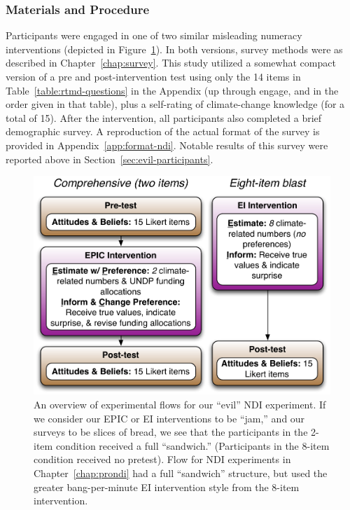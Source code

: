 \subsubsection{Materials and Procedure}

Participants were engaged in one of two similar misleading numeracy
interventions (depicted in Figure~\ref{fig:evil-flow}). In both versions, survey
methods were as described in Chapter~\ref{chap:survey}. This study utilized a
somewhat compact version of a pre and post-intervention test using only the 14
items in Table~\ref{table:rtmd-questions} in the Appendix (up through
\textsf{engage}, and in the order given in that table), plus a self-rating of
climate-change knowledge (for a total of 15).  After the intervention, all
participants also completed a brief demographic survey.  A reproduction of the
actual format of the survey is provided in Appendix~\ref{app:format-ndi}.
Notable results of this survey were reported above in
Section~\ref{sec:evil-participants}.

\begin{figure}[h]
    \includegraphics[width=6.5in]{evil-ndi-survey-flow.pdf}
    \caption{An overview of experimental flows for our “evil” NDI experiment. If
        we consider our EPIC or EI interventions to be “jam,” and our surveys to
        be slices of bread, we see that the participants in the 2-item condition
        received a full “sandwich.” (Participants in the 8-item condition
        received no pretest).  Flow for NDI experiments in
        Chapter~\ref{chap:prondi} had a full “sandwich” structure, but used the
        greater bang-per-minute EI intervention style from the 8-item
        intervention.}
    \label{fig:evil-flow}
\end{figure}

